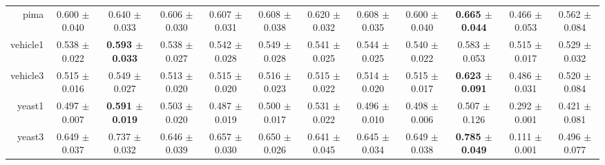 \begin{table}[!ht]
{\begin{tabular}{r c c c c c c c c c c c}
pima & 0.600 $\pm$ 0.040 & 0.640 $\pm$ 0.033 & 0.606 $\pm$ 0.030 & 0.607 $\pm$ 0.031 & 0.608 $\pm$ 0.038 & 0.620 $\pm$ 0.032 & 0.608 $\pm$ 0.035 & 0.600 $\pm$ 0.040 & \textbf{0.665 $\pm$ 0.044} & 0.466 $\pm$ 0.053 & 0.562 $\pm$ 0.084 \\
vehicle1 & 0.538 $\pm$ 0.022 & \textbf{0.593 $\pm$ 0.033} & 0.538 $\pm$ 0.027 & 0.542 $\pm$ 0.028 & 0.549 $\pm$ 0.028 & 0.541 $\pm$ 0.025 & 0.544 $\pm$ 0.025 & 0.540 $\pm$ 0.022 & 0.583 $\pm$ 0.053 & 0.515 $\pm$ 0.017 & 0.529 $\pm$ 0.032 \\
vehicle3 & 0.515 $\pm$ 0.016 & 0.549 $\pm$ 0.027 & 0.513 $\pm$ 0.020 & 0.515 $\pm$ 0.020 & 0.516 $\pm$ 0.023 & 0.515 $\pm$ 0.022 & 0.514 $\pm$ 0.020 & 0.515 $\pm$ 0.017 & \textbf{0.623 $\pm$ 0.091} & 0.486 $\pm$ 0.031 & 0.520 $\pm$ 0.084 \\
yeast1 & 0.497 $\pm$ 0.007 & \textbf{0.591 $\pm$ 0.019} & 0.503 $\pm$ 0.020 & 0.487 $\pm$ 0.019 & 0.500 $\pm$ 0.017 & 0.531 $\pm$ 0.022 & 0.496 $\pm$ 0.010 & 0.498 $\pm$ 0.006 & 0.507 $\pm$ 0.126 & 0.292 $\pm$ 0.001 & 0.421 $\pm$ 0.081 \\
yeast3 & 0.649 $\pm$ 0.037 & 0.737 $\pm$ 0.032 & 0.646 $\pm$ 0.039 & 0.657 $\pm$ 0.030 & 0.650 $\pm$ 0.026 & 0.641 $\pm$ 0.045 & 0.645 $\pm$ 0.034 & 0.649 $\pm$ 0.038 & \textbf{0.785 $\pm$ 0.049} & 0.111 $\pm$ 0.001 & 0.496 $\pm$ 0.077 \\
\end{tabular}}
\end{table}
